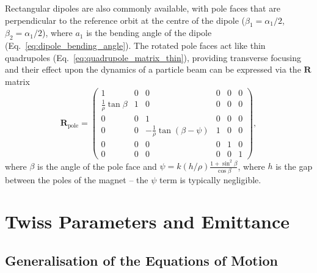 \documentclass[../main.tex]{subfiles}
\begin{document}
Rectangular dipoles are also commonly available, with pole faces that are perpendicular to the reference orbit at the centre of the dipole ($\beta_{1}=\alpha_{1}/2$, $\beta_{2}=\alpha_{1}/2$),  where $a_{1}$ is the bending angle of the dipole (Eq.~\ref{eq:dipole_bending_angle}). The rotated pole faces act like thin quadrupoles (Eq.~\ref{eq:quadrupole_matrix_thin}), providing transverse focusing and their effect upon the dynamics of a particle beam can be expressed via the $\boldsymbol{R}$ matrix
\begin{equation}
\boldsymbol{R}_{\mathrm{pole}} =
\begin{pmatrix}
1 & 0 & 0 & 0 & 0 & 0 \\
\frac{1}{\rho}\tan\beta & 1 & 0 & 0 & 0 & 0 \\
0 & 0 & 1 & 0 & 0 & 0 \\
0 & 0 & -\frac{1}{\rho}\tan\left(\beta-\psi\right) & 1 & 0 & 0 \\
0 & 0 & 0 & 0 & 1 & 0 \\
0 & 0 & 0 & 0 & 0 & 1
\end{pmatrix},
\label{eq:pole_face_matrix}    
\end{equation}
where $\beta$ is the angle of the pole face and $\psi = k\left(h/\rho\right)\frac{1+\sin^{2}\beta}{\cos\beta}$, where $h$ is the gap between the poles of the magnet -- the $\psi$ term is typically negligible. 

\section{Twiss Parameters and Emittance}
\label{sec:twiss_emittance}

\subsection{Generalisation of the Equations of Motion}
\end{document}
